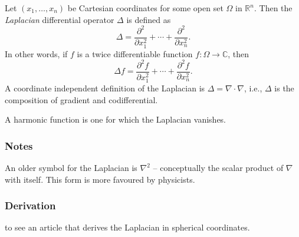 \documentclass[12pt]{article}
\newcommand{\sR}[0]{\mathbb{R}}
\newcommand{\sC}[0]{\mathbb{C}}
\begin{document}
Let $(x_1, \ldots, x_n)$ be Cartesian coordinates for some open set  $\Omega$ 
in $\sR^n$. 
Then the \emph{Laplacian} differential operator $\Delta$ is defined as
$$
\Delta = \frac{\partial^2 }{\partial x_1^2} + \cdots + \frac{\partial^2 }{\partial x_n^2}.
$$
In other words, if $f$ is a twice differentiable function $f:\Omega\to \sC$, then 
$$
\Delta f = \frac{\partial^2 f}{\partial x_1^2} + \cdots + \frac{\partial^2 f}{\partial x_n^2}.
$$
A coordinate independent definition of the Laplacian 
is $\Delta = \nabla \cdot \nabla$, i.e., $\Delta$ is the composition of 
gradient and codifferential.

A harmonic function is one for which the Laplacian vanishes.


\subsubsection*{Notes}
An older symbol for the Laplacian is $\nabla^2$ -- conceptually the scalar product of $\nabla$ with itself. This form is more favoured by physicists.

\subsubsection*{Derivation}
 to see an article that derives the Laplacian in spherical coordinates.

\end{document}
